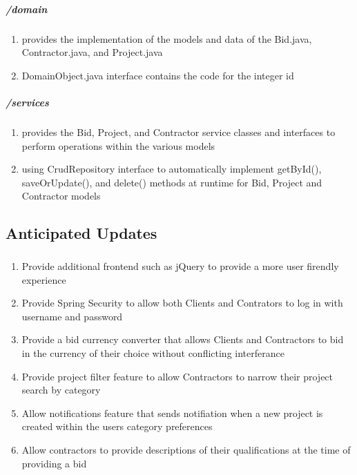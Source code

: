 \documentclass[a4paper,12pt]{article}
\begin{document}
\subparagraph{/domain}
\begin{enumerate}[label=(\alph*)]
\item provides the implementation of the models and data of the Bid.java, Contractor.java, and Project.java
\item DomainObject.java interface contains the code for the integer id
\end{enumerate}

\subparagraph{/services}
\begin{enumerate}[label=(\alph*)]
\item provides the Bid, Project, and Contractor service classes and interfaces to perform operations within the various models
\item using CrudRepository interface to automatically implement getById(), saveOrUpdate(), and delete() methods at runtime for Bid, Project and Contractor models
\end{enumerate}
 

\subsection{Anticipated Updates}
\subparagraph{}
\begin{enumerate}[label=(\alph*)]
\item Provide additional frontend such as jQuery to provide a more user firendly experience
\item Provide Spring Security to allow both Clients and Contrators to log in with username and password
\item Provide a bid currency converter that allows Clients and Contractors to bid in the currency of their choice without conflicting interferance
\item Provide project filter feature to allow Contractors to narrow their project search by category
\item Allow notifications feature that sends notifiation when a new project is created within the users category preferences
\item Allow contractors to provide descriptions of their qualifications at the time of providing a bid
\end{enumerate}
\end{document}
